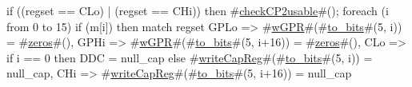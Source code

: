 if ((regset == CLo) | (regset == CHi)) then
  #\hyperref[sailMIPSzcheckCP2usable]{checkCP2usable}#();
foreach (i from 0 to 15)
  if (m[i]) then
    match regset {
      GPLo  => #\hyperref[sailMIPSzwGPR]{wGPR}#(#\hyperref[sailMIPSztozybits]{to\_bits}#(5, i)) = #\hyperref[sailMIPSzzzeros]{zeros}#(),
      GPHi  => #\hyperref[sailMIPSzwGPR]{wGPR}#(#\hyperref[sailMIPSztozybits]{to\_bits}#(5, i+16)) = #\hyperref[sailMIPSzzzeros]{zeros}#(),
      CLo   => if i == 0 then
                 DDC = null_cap
               else
                 #\hyperref[sailMIPSzwriteCapReg]{writeCapReg}#(#\hyperref[sailMIPSztozybits]{to\_bits}#(5, i)) = null_cap,
      CHi   => #\hyperref[sailMIPSzwriteCapReg]{writeCapReg}#(#\hyperref[sailMIPSztozybits]{to\_bits}#(5, i+16)) = null_cap
    }
